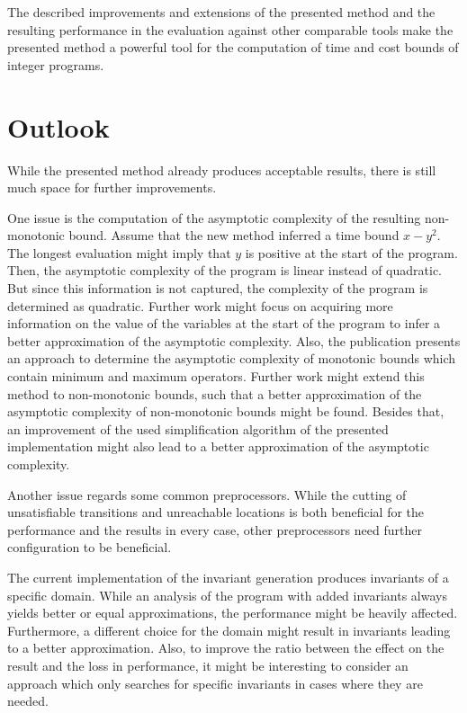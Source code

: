 The described improvements and extensions of the presented method and the resulting performance in the evaluation against other comparable tools make the presented method a powerful tool for the computation of time and cost bounds of integer programs.

\section{Outlook}

While the presented method already produces acceptable results, there is still much space for further improvements.

One issue is the computation of the asymptotic complexity of the resulting non-monotonic bound.
Assume that the new method inferred a time bound $x-y^2$.
The longest evaluation might imply that $y$ is positive at the start of the program.
Then, the asymptotic complexity of the program is linear instead of quadratic.
But since this information is not captured, the complexity of the program is determined as quadratic.
Further work might focus on acquiring more information on the value of the variables at the start of the program to infer a better approximation of the asymptotic complexity.
Also, the publication \cite{albert2009asymptotic} presents an approach to determine the asymptotic complexity of monotonic bounds which contain minimum and maximum operators.
Further work might extend this method to non-monotonic bounds, such that a better approximation of the asymptotic complexity of non-monotonic bounds might be found.
Besides that, an improvement of the used simplification algorithm of the presented implementation might also lead to a better approximation of the asymptotic complexity.

Another issue regards some common preprocessors.
While the cutting of unsatisfiable transitions and unreachable locations is both beneficial for the performance and the results in every case, other preprocessors need further configuration to be beneficial.

The current implementation of the invariant generation produces invariants of a specific domain.
While an analysis of the program with added invariants always yields better or equal approximations, the performance might be heavily affected.
Furthermore, a different choice for the domain might result in invariants leading to a better approximation.
Also, to improve the ratio between the effect on the result and the loss in performance, it might be interesting to consider an approach which only searches for specific invariants in cases where they are needed.

